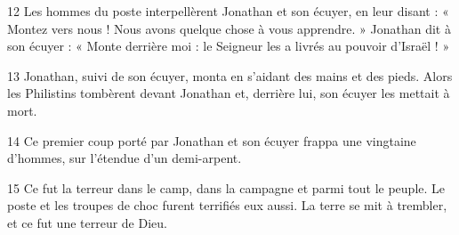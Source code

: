 
12 Les hommes du poste interpellèrent Jonathan et son écuyer, en leur disant : « Montez vers nous ! Nous avons quelque chose à vous apprendre. » Jonathan dit à son écuyer : « Monte derrière moi : le Seigneur les a livrés au pouvoir d’Israël ! »

13 Jonathan, suivi de son écuyer, monta en s’aidant des mains et des pieds. Alors les Philistins tombèrent devant Jonathan et, derrière lui, son écuyer les mettait à mort.

14 Ce premier coup porté par Jonathan et son écuyer frappa une vingtaine d’hommes, sur l’étendue d’un demi-arpent.

15 Ce fut la terreur dans le camp, dans la campagne et parmi tout le peuple. Le poste et les troupes de choc furent terrifiés eux aussi. La terre se mit à trembler, et ce fut une terreur de Dieu.
